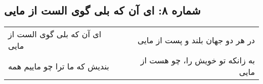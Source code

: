\begin{center}
\section*{شماره ۸: ای آن که بلی گوی الست از مایی}
\label{sec:008}
\begin{longtable}{l p{0.5cm} r}
ای آن که بلی گوی الست از مایی
&&
در هر دو جهان بلند و پست از مایی
\\
بندیش که ما ترا چو ماییم همه
&&
به زانکه تو خویش را، چو هست از مایی
\\
\end{longtable}
\end{center}

